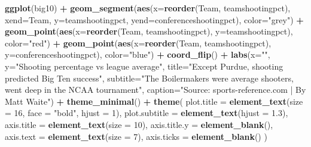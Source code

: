 \documentclass[]{book}
\newenvironment{Shaded}{\begin{snugshade}}{\end{snugshade}}
\newcommand{\DataTypeTok}[1]{\textcolor[rgb]{0.13,0.29,0.53}{#1}}
\newcommand{\DecValTok}[1]{\textcolor[rgb]{0.00,0.00,0.81}{#1}}
\newcommand{\FloatTok}[1]{\textcolor[rgb]{0.00,0.00,0.81}{#1}}
\newcommand{\KeywordTok}[1]{\textcolor[rgb]{0.13,0.29,0.53}{\textbf{#1}}}
\newcommand{\NormalTok}[1]{#1}
\newcommand{\OperatorTok}[1]{\textcolor[rgb]{0.81,0.36,0.00}{\textbf{#1}}}
\newcommand{\StringTok}[1]{\textcolor[rgb]{0.31,0.60,0.02}{#1}}
\begin{document}
\begin{Shaded}
\begin{Highlighting}[]
\KeywordTok{ggplot}\NormalTok{(big10) }\OperatorTok{+}
\StringTok{  }\KeywordTok{geom_segment}\NormalTok{(}\KeywordTok{aes}\NormalTok{(}\DataTypeTok{x=}\KeywordTok{reorder}\NormalTok{(Team, teamshootingpct), }\DataTypeTok{xend=}\NormalTok{Team, }\DataTypeTok{y=}\NormalTok{teamshootingpct, }\DataTypeTok{yend=}\NormalTok{conferenceshootingpct), }\DataTypeTok{color=}\StringTok{"grey"}\NormalTok{) }\OperatorTok{+}\StringTok{ }
\StringTok{  }\KeywordTok{geom_point}\NormalTok{(}\KeywordTok{aes}\NormalTok{(}\DataTypeTok{x=}\KeywordTok{reorder}\NormalTok{(Team, teamshootingpct), }\DataTypeTok{y=}\NormalTok{teamshootingpct), }\DataTypeTok{color=}\StringTok{"red"}\NormalTok{) }\OperatorTok{+}\StringTok{ }
\StringTok{  }\KeywordTok{geom_point}\NormalTok{(}\KeywordTok{aes}\NormalTok{(}\DataTypeTok{x=}\KeywordTok{reorder}\NormalTok{(Team, teamshootingpct), }\DataTypeTok{y=}\NormalTok{conferenceshootingpct), }\DataTypeTok{color=}\StringTok{"blue"}\NormalTok{) }\OperatorTok{+}
\StringTok{  }\KeywordTok{coord_flip}\NormalTok{() }\OperatorTok{+}
\StringTok{   }\KeywordTok{labs}\NormalTok{(}\DataTypeTok{x=}\StringTok{""}\NormalTok{, }\DataTypeTok{y=}\StringTok{"Shooting percentage vs league average"}\NormalTok{, }\DataTypeTok{title=}\StringTok{"Except Purdue, shooting predicted Big Ten success"}\NormalTok{, }\DataTypeTok{subtitle=}\StringTok{"The Boilermakers were average shooters, went deep in the NCAA tournament"}\NormalTok{, }\DataTypeTok{caption=}\StringTok{"Source: sports-reference.com | By Matt Waite"}\NormalTok{) }\OperatorTok{+}
\StringTok{  }\KeywordTok{theme_minimal}\NormalTok{() }\OperatorTok{+}\StringTok{ }
\StringTok{  }\KeywordTok{theme}\NormalTok{(}
    \DataTypeTok{plot.title =} \KeywordTok{element_text}\NormalTok{(}\DataTypeTok{size =} \DecValTok{16}\NormalTok{, }\DataTypeTok{face =} \StringTok{"bold"}\NormalTok{, }\DataTypeTok{hjust =} \DecValTok{1}\NormalTok{),}
    \DataTypeTok{plot.subtitle =} \KeywordTok{element_text}\NormalTok{(}\DataTypeTok{hjust =} \FloatTok{1.3}\NormalTok{),}
    \DataTypeTok{axis.title =} \KeywordTok{element_text}\NormalTok{(}\DataTypeTok{size =} \DecValTok{10}\NormalTok{),}
    \DataTypeTok{axis.title.y =} \KeywordTok{element_blank}\NormalTok{(),}
    \DataTypeTok{axis.text =} \KeywordTok{element_text}\NormalTok{(}\DataTypeTok{size =} \DecValTok{7}\NormalTok{),}
    \DataTypeTok{axis.ticks =} \KeywordTok{element_blank}\NormalTok{()}
\NormalTok{  )}
\end{Highlighting}
\end{Shaded}
\end{document}
